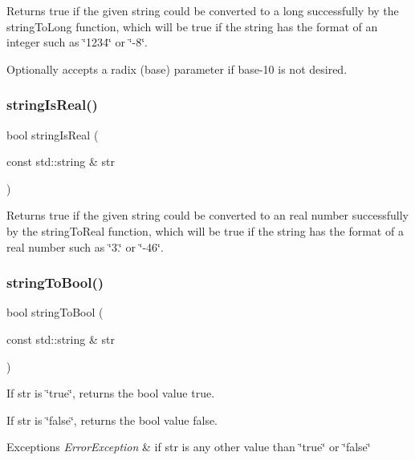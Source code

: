 Returns true if the given string could be converted to a long successfully by the string\+To\+Long function, which will be true if the string has the format of an integer such as \char`\"{}1234\char`\"{} or \char`\"{}-\/8\char`\"{}. 

Optionally accepts a radix (base) parameter if base-\/10 is not desired. \mbox{\label{namespacesgl_1_1priv_1_1strlib_a2b4e3df7dfde2e8c5e78cdf7b31e03ce}} 
\subsubsection{\texorpdfstring{string\+Is\+Real()}{stringIsReal()}}
{\footnotesize\ttfamily bool string\+Is\+Real (\begin{DoxyParamCaption}\item[{const std\+::string \&}]{str }\end{DoxyParamCaption})}



Returns true if the given string could be converted to an real number successfully by the string\+To\+Real function, which will be true if the string has the format of a real number such as \char`\"{}3.\char`\"{} or \char`\"{}-\/46\char`\"{}. 

\mbox{\label{namespacesgl_1_1priv_1_1strlib_ad026739e163ac00059e145060cba9eec}} 
\subsubsection{\texorpdfstring{string\+To\+Bool()}{stringToBool()}}
{\footnotesize\ttfamily bool string\+To\+Bool (\begin{DoxyParamCaption}\item[{const std\+::string \&}]{str }\end{DoxyParamCaption})}



If str is \char`\"{}true\char`\"{}, returns the bool value true. 

If str is \char`\"{}false\char`\"{}, returns the bool value false. 
\begin{DoxyExceptions}{Exceptions}
{\em Error\+Exception} & if str is any other value than \char`\"{}true\char`\"{} or \char`\"{}false\char`\"{} \\
\hline
\end{DoxyExceptions}
\mbox{\label{namespacesgl_1_1priv_1_1strlib_a7327a216701560fa447a513814916ecf}} 

